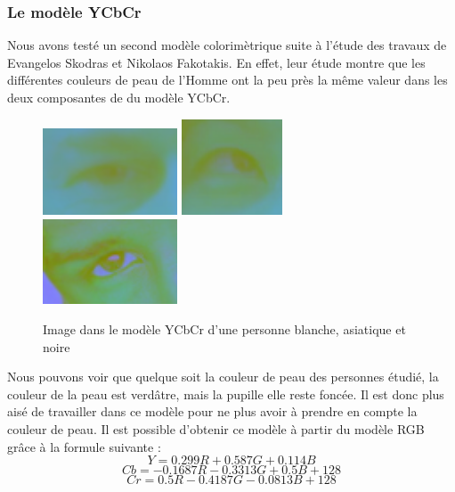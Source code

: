 \subsubsection{Le modèle YCbCr}

Nous avons testé un second modèle colorimètrique suite à l'étude des travaux de Evangelos Skodras et Nikolaos Fakotakis\cite{Skodras_2012ieee}.
En effet, leur étude montre que les différentes couleurs de peau de l'Homme ont la peu près la même valeur dans les deux
composantes de du modèle YCbCr.\\

\begin{figure}[H]
 \center
 \includegraphics[width=4cm]{image/yuv_blanc.png}
 \includegraphics[width=3cm]{image/yuv_asiat.png}
 \includegraphics[width=4cm]{image/yuv_noire.png}
 \caption{Image dans le modèle YCbCr d'une personne blanche, asiatique et noire}
\end{figure}

Nous pouvons voir que quelque soit la couleur de peau des personnes étudié, la couleur
de la peau est verdâtre, mais la pupille elle reste foncée. Il est donc plus aisé de travailler 
dans ce modèle pour ne plus avoir à prendre en compte la couleur de peau. Il est possible d'obtenir
ce modèle à partir du modèle RGB grâce à la formule suivante : 
$$Y = 0.299R + 0.587 G + 0.114 B$$
$$Cb = -0.1687R - 0.3313 G + 0.5B + 128$$
$$Cr = 0.5R -0.4187G -0.0813B + 128$$

